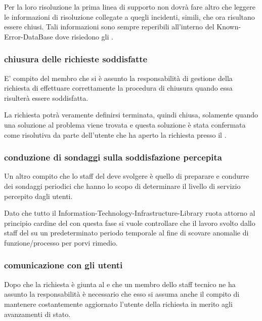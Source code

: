 Per la loro risoluzione la prima linea di supporto non dovrà fare altro che leggere le informazioni di risoluzione collegate a quegli incidenti, simili, che ora risultano essere chiusi. Tali informazioni sono sempre reperibili all'interno del \ac{Known-Error-DataBase} dove risiedono gli .

\subsubsection[Chiusura delle richieste soddisfatte]{chiusura delle richieste soddisfatte}
E' compito del membro che si è assunto la responsabilità di gestione della richiesta di effettuare correttamente la procedura di chiusura quando essa risulterà essere soddisfatta.

La richiesta potrà veramente definirsi terminata, quindi chiusa, solamente quando una soluzione al problema viene trovata e questa soluzione è stata confermata come risolutiva da parte dell'utente che ha aperto la richiesta presso il .

\subsubsection[Conduzione di sondaggi sulla soddisfazione percepita]{conduzione di sondaggi sulla soddisfazione percepita}
Un altro compito che lo staff del  deve svolgere è quello di preparare e condurre dei sondaggi periodici che hanno lo scopo di determinare il livello di servizio percepito dagli utenti.

Dato che tutto il  \ac{Information-Technology-Infrastructure-Library} ruota attorno al principio cardine del  con questa fase si vuole controllare che il lavoro svolto dallo staff del  su un predeterminato periodo temporale al fine di scovare anomalie di funzione/processo per porvi rimedio.

\subsubsection[Comunicazione con gli utenti]{comunicazione con gli utenti}
Dopo che la richiesta è giunta al  e che un membro dello staff tecnico ne ha assunto la responsabilità è necessario che esso si assuma anche il compito di mantenere costantemente aggiornato l'utente della richiesta in merito agli avanzamenti di stato.

